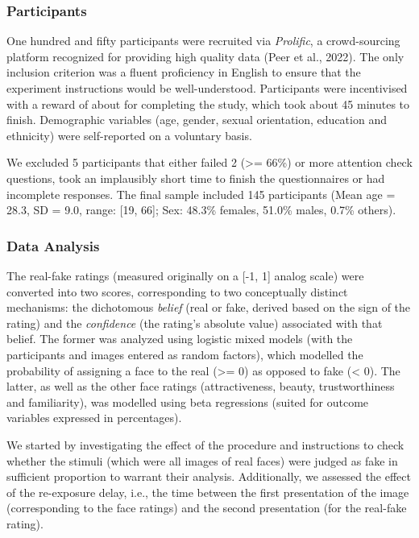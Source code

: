 \documentclass[
  man,floatsintext]{apa6}
\begin{document}
\hypertarget{participants}{%
\subsubsection{Participants}\label{participants}}

One hundred and fifty participants were recruited via \emph{Prolific}, a crowd-sourcing platform recognized for providing high quality data (Peer et al., 2022). The only inclusion criterion was a fluent proficiency in English to ensure that the experiment instructions would be well-understood. Participants were incentivised with a reward of about  for completing the study, which took about 45 minutes to finish. Demographic variables (age, gender, sexual orientation, education and ethnicity) were self-reported on a voluntary basis.

We excluded 5 participants that either failed 2 (\textgreater= 66\%) or more attention check questions, took an implausibly short time to finish the questionnaires or had incomplete responses. The final sample included 145 participants (Mean age = 28.3, SD = 9.0, range: {[}19, 66{]}; Sex: 48.3\% females, 51.0\% males, 0.7\% others).

\hypertarget{data-analysis}{%
\subsubsection{Data Analysis}\label{data-analysis}}

The real-fake ratings (measured originally on a {[}-1, 1{]} analog scale) were converted into two scores, corresponding to two conceptually distinct mechanisms: the dichotomous \emph{belief} (real or fake, derived based on the sign of the rating) and the \emph{confidence} (the rating's absolute value) associated with that belief. The former was analyzed using logistic mixed models (with the participants and images entered as random factors), which modelled the probability of assigning a face to the real (\textgreater= 0) as opposed to fake (\textless{} 0). The latter, as well as the other face ratings (attractiveness, beauty, trustworthiness and familiarity), was modelled using beta regressions (suited for outcome variables expressed in percentages).

We started by investigating the effect of the procedure and instructions to check whether the stimuli (which were all images of real faces) were judged as fake in sufficient proportion to warrant their analysis. Additionally, we assessed the effect of the re-exposure delay, i.e., the time between the first presentation of the image (corresponding to the face ratings) and the second presentation (for the real-fake rating).
\end{document}
